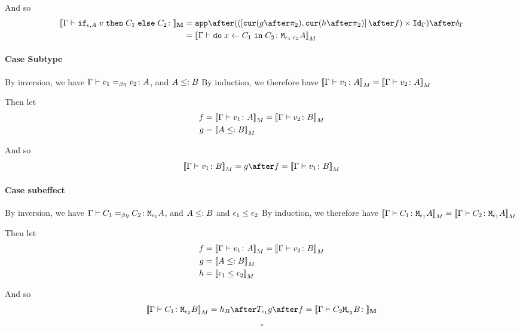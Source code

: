 {    And so
    \begin{equation}
        \begin{split}
            \deno{\gtyperelation{\ifthenelse{\e}{A}{v}{C_1}{C_2}}} & = \ifMorph{f}{g}{h}\\
             & = \deno{\gtyperelation{\doin{x}{C_1}{C_2}}{\M{\e_1\dot\e_2}{A}}}
        \end{split}
    \end{equation}
    \paragraph{Case Subtype}
    By inversion, we have $\Gamma \vdash v_1 =_{\beta\eta} v_2 \colon A$, and $A \leq: B$ 
    By induction, we therefore have ${\bf [\![}\Gamma \vdash v_1 \colon A{\bf ]\!]}_M = {\bf [\![}\Gamma \vdash v_2 \colon A{\bf ]\!]}_M$

    Then let
    \begin{align}
        f &{}={\bf [\![}\Gamma \vdash v_1 \colon A{\bf ]\!]}_M = {\bf [\![}\Gamma \vdash v_2 \colon B{\bf ]\!]}_M\\
        g &{}={\bf [\![}A \leq: B{\bf ]\!]}_M
    \end{align}



    And so
    \begin{equation}
            \deno{\gtyperelation{v_1}{B}} = g \after f = \deno{\gtyperelation{v_1}{B}}
    \end{equation}
    \paragraph{Case subeffect}
    By inversion, we have $\Gamma \vdash C_1 =_{\beta\eta} C_2 \colon \texttt{M}_{\epsilon_1}{A}$, and $A \leq: B$ and $\epsilon_1 \leq \epsilon_2$
    By induction, we therefore have ${\bf [\![}\Gamma \vdash C_1 \colon \texttt{M}_{\epsilon_1}{A}{\bf ]\!]}_M = {\bf [\![}\Gamma \vdash C_2 \colon \texttt{M}_{\epsilon_1}{A}{\bf ]\!]}_M$

    Then let
    \begin{align}
        f &{}=\deno{\gtyperelation{v_1}{A}} = \deno{\gtyperelation{v_2}{B}}\\
        g &{}=\deno{A \subtype B}\\
        h &{}=\deno{\e_1\subeffect\e_2}
    \end{align}

    And so
    \begin{equation}
            \deno{\gtyperelation{C_1}{\M{\e_2}{B}}} = h_B \after \T{\e_1}{g} \after f = \deno{\gtyperelation{C_2{\M{\e_2}{B}}}}
    \end{equation}

    $$\square$$
}

\ifdefined\NoDocument
\else
\documentclass{report}





   \BetaEtaEquivalence

\fi